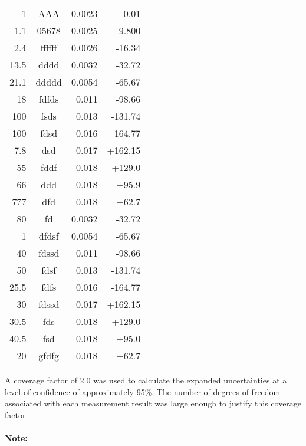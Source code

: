 \documentclass[IANZ]{MSLCalCert}
\begin{document}
\begin{longtable}{D{.}{.}{4}cD{.}{.}{4}D{.}{.}{4}}
1 & AAA & 0.0023 & -0.01\\
1.1 & 05678 & 0.0025 & -9.800\\
2.4 & ffffff & 0.0026 & -16.34\\
13.5 & dddd & 0.0032 & -32.72\\
21.1 & ddddd & 0.0054 & -65.67\\
18 & fdfds & 0.011 & -98.66\\
100 & fsds & 0.013 & -131.74\\
100 & fdsd & 0.016 & -164.77\\
7.8 & dsd & 0.017 & +162.15\\
55 & fddf & 0.018 & +129.0\\
66 & ddd & 0.018 & +95.9\\
777 & dfd & 0.018 & +62.7\\
80 & fd & 0.0032 & -32.72\\
1 & dfdsf & 0.0054 & -65.67\\
40 & fdssd & 0.011 & -98.66\\
50 & fdsf & 0.013 & -131.74\\
25.5 & fdfs & 0.016 & -164.77\\
30 & fdssd & 0.017 & +162.15\\
30.5 & fds & 0.018 & +129.0\\
40.5 & fsd & 0.018 & +95.0\\
20 & gfdfg & 0.018 & +62.7\\

\end{longtable}

A coverage factor of 2.0 was used to calculate the expanded uncertainties at a level of confidence of approximately 95\%. The number of degrees of freedom associated with each measurement result was large enough to justify this coverage factor.

\paragraph{Note:} 
{}
\signaturesAB
\end{document}
